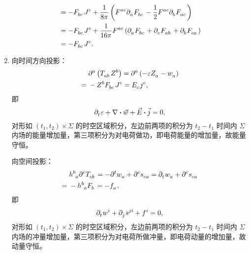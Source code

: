 \begin{xiti}
\begin{zm}
\begin{enumerate}[label=(\alph*)]
\begin{equation*}
\begin{split}
						&= - \tensor{F}{_b_c} \tensor{J}{^c} + \frac{1}{8\pi} \left( \tensor{F}{^a^c} \tensor{\partial}{_a} \tensor{F}{_b_c} - \frac{1}{2} \tensor{F}{^a^c} \tensor{\partial}{_b} \tensor{F}{_a_c} \right)\\
						&= - \tensor{F}{_b_c} \tensor{J}{^c} + \frac{1}{16\pi} \tensor{F}{^a^c} \left( \tensor{\partial}{_a} \tensor{F}{_b_c} + \tensor{\partial}{_c} \tensor{F}{_a_b} + \tensor{\partial}{_b} \tensor{F}{_c_a} \right)\\
						&= - \tensor{F}{_b_c} \tensor{J}{^c}.
					\end{split}
				\end{equation*}
				\item 向时间方向投影：
				\begin{equation*}
					\begin{split}
						&\tensor{\partial}{^a} \left( \tensor{T}{_a_b} \tensor{Z}{^b} \right) = \tensor{\partial}{^a} \left( -\varepsilon \tensor{Z}{_a} - \tensor{w}{_a} \right)\\
						={}& - \tensor{Z}{^b} \tensor{F}{_b_c} \tensor{J}{^c} = \tensor{E}{_c} \tensor{j}{^c},
					\end{split}
				\end{equation*}
				即
				\begin{equation*}
					\Partial{t} \varepsilon + \nabla \vdot \myvec{w} + \myvec{E} \vdot \myvec{j} = 0,
				\end{equation*}
				对形如 $(t_1,t_2) \times \Sigma$ 的时空区域积分，左边前两项的积分为 $t_2-t_1$ 时间内 $\Sigma$ 内场的能量增加量，第三项积分为对电荷做功，即电荷能量的增加量，故能量守恒。

				向空间投影：
				\begin{equation*}
					\begin{split}
						&\tensor{h}{^b_a} \tensor{\partial}{^c} \tensor{T}{_c_b} = -\tensor{\partial}{^t} \tensor{w}{_a} + \tensor{\partial}{^c} \tensor{s}{_c_a}=\tensor{\partial}{_t} \tensor{w}{_a} + \tensor{\partial}{^c} \tensor{s}{_c_a}\\
						={}& -\tensor{h}{^b_a} \tensor{F}{_b} = -\tensor{f}{_a},
					\end{split}
				\end{equation*}
				即
				\begin{equation*}
					\Partial{t} \tensor{w}{^i} + \Partial{j} \tensor{s}{^j^i} + \tensor{f}{^i} = 0,
				\end{equation*}
				对形如 $(t_1,t_2) \times \Sigma$ 的时空区域积分，左边前两项的积分为 $t_2-t_1$ 时间内 $\Sigma$ 内场的冲量增加量，第三项积分为对电荷所做冲量，即电荷动量的增加量，故动量守恒。
			\end{enumerate}
		\end{zm}
	
\end{xiti}